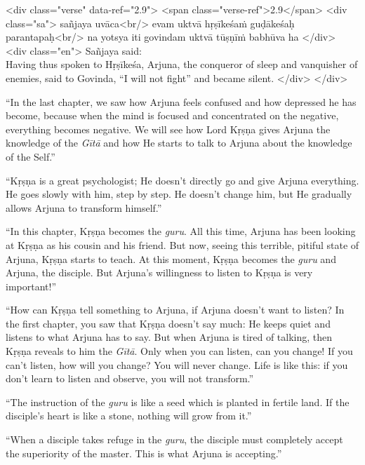 \begin{html}
<div class="verse" data-ref="2.9">
  <span class="verse-ref">2.9</span>
  <div class="sa">
    sañjaya uvāca<br/>
    evam uktvā hṛṣīkeśaṁ guḍākeśaḥ parantapaḥ<br/>
    na yotsya iti govindam uktvā tūṣṇīṁ babhūva ha
  </div>
  <div class="en">
    \hspace*{1em}Sañjaya said: \\ Having thus spoken to Hṛṣīkeśa, Arjuna, the conqueror of sleep and vanquisher of enemies, said to Govinda, \enquote{I will not fight} and became silent.
  </div>
</div>
\end{html}


\enquote{In the last chapter, we saw how Arjuna feels confused and how depressed he has become, because when the mind is focused and concentrated on the negative, everything becomes negative. We will see how Lord Kṛṣṇa gives Arjuna the knowledge of the \textit{Gītā} and how He starts to talk to Arjuna about the knowledge of the Self.}

\enquote{Kṛṣṇa is a great psychologist; He doesn’t directly go and give Arjuna everything. He goes slowly with him, step by step. He doesn’t change him, but He gradually allows Arjuna to transform himself.}

\enquote{In this chapter, Kṛṣṇa becomes the \textit{guru}. All this time, Arjuna has been looking at Kṛṣṇa as his cousin and his friend. But now, seeing this terrible, pitiful state of Arjuna, Kṛṣṇa starts to teach. At this moment, Kṛṣṇa becomes the \textit{guru} and Arjuna, the disciple. But Arjuna’s willingness to listen to Kṛṣṇa is very important!}

\enquote{How can Kṛṣṇa tell something to Arjuna, if Arjuna doesn’t want to listen? In the first chapter, you saw that Kṛṣṇa doesn’t say much: He keeps quiet and listens to what Arjuna has to say. But when Arjuna is tired of talking, then Kṛṣṇa reveals to him the \textit{Gītā}. Only when you can listen, can you change! If you can’t listen, how will you change? You will never change. Life is like this: if you don’t learn to listen and observe, you will not transform.}

\enquote{The instruction of the \textit{guru} is like a seed which is planted in fertile land. If the disciple’s heart is like a stone, nothing will grow from it.}

\enquote{When a disciple takes refuge in the \textit{guru}, the disciple must completely accept the superiority of the master. This is what Arjuna is accepting.}

